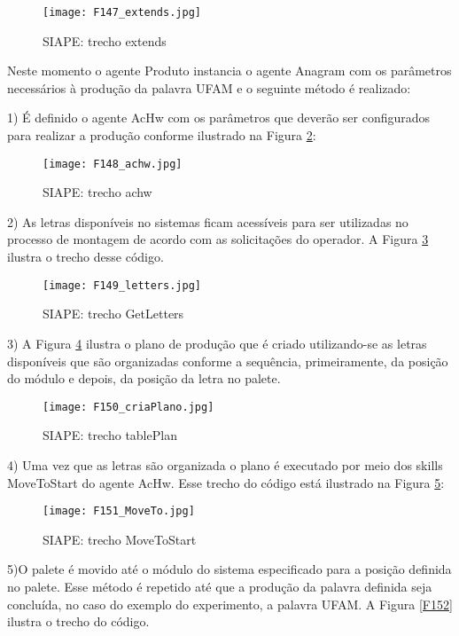 	
	\begin{figure}[!h]
		\centering
		\texttt{[image: F147\_extends.jpg]} 
		\caption{SIAPE: trecho extends}
		\label{F147}
	\end{figure}
	
	Neste momento o agente Produto instancia o agente Anagram com os parâmetros necessários à produção da palavra UFAM e o seguinte método é realizado:
	
	1) É definido o agente AcHw com os parâmetros que deverão ser configurados para realizar a produção conforme ilustrado na Figura \ref{F148}:

		\begin{figure}[!h]
			\centering
			\texttt{[image: F148\_achw.jpg]} 
			\caption{SIAPE: trecho achw}
			\label{F148}
		\end{figure}
	
	2) As letras disponíveis no sistemas ficam acessíveis para ser utilizadas no processo de montagem de acordo com as solicitações do operador. A Figura \ref{F149} ilustra o trecho desse código.
	
		\begin{figure}[!h]
			\centering
			\texttt{[image: F149\_letters.jpg]} 
			\caption{SIAPE: trecho GetLetters}
			\label{F149}
		\end{figure}
	
	3) A Figura \ref{F150} ilustra o plano de produção que é criado utilizando-se as letras disponíveis que são organizadas conforme a sequência, primeiramente, da posição do módulo e depois, da posição da letra no palete.
	
		\begin{figure}[!h]
			\centering
			\texttt{[image: F150\_criaPlano.jpg]} 
			\caption{SIAPE: trecho tablePlan}
			\label{F150}
		\end{figure}
	
	4) Uma vez que as letras são organizada o plano é executado por meio dos skills MoveToStart do agente AcHw. Esse trecho do código está ilustrado na Figura \ref{F151}:
	
		\begin{figure}[!h]
			\centering
			\texttt{[image: F151\_MoveTo.jpg]} 
			\caption{SIAPE: trecho MoveToStart}
			\label{F151}
		\end{figure}
	5)O palete é movido até o módulo do sistema especificado para a posição definida no palete. Esse método é repetido até que a produção da palavra definida seja concluída, no caso do exemplo do experimento, a palavra UFAM. A Figura \ref{F152} ilustra o trecho do código.

